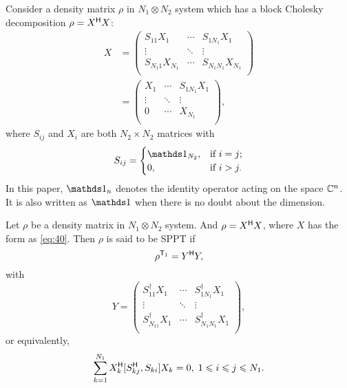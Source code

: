 Consider a density matrix $\rho$ in $N_1\otimes N_2$ system which has a block Cholesky decomposition $\rho = X^{\mathsf{H}} X$:
\begin{equation}
  \label{eq:40}
  \begin{split}
    X&=
    \begin{pmatrix}
      S_{11}X_1 &\cdots&S_{1N_1}X_1\\
      \vdots&\ddots& \vdots\\
      S_{N_1 1}X_{N_1}&\cdots&S_{N_1N_1}X_{N_1}\\
    \end{pmatrix}\\
    & =
    \begin{pmatrix}
      X_1 &\cdots&S_{1N_1}X_1\\
      \vdots&\ddots& \vdots\\
      0&\cdots&X_{N_1}\\
    \end{pmatrix},
  \end{split}
\end{equation}
where $S_{ij}$ and $X_i$ are both $N_2\times N_2$ matrices with
\begin{equation*}
  S_{ij} =
  \begin{cases}
    \I_{N_2}, & \text {if } i=j;\\
    0, & \text{if }i > j.
  \end{cases}
\end{equation*}
In this paper,    $\I_n$ denotes the identity operator acting on the space $\mathbb{C}^n$. It is also written   
as $\I$ when there is no doubt about the dimension.
\begin{defi}
  Let $\rho$ be a density matrix in $N_1\otimes N_2$ system. And $\rho = X^{\mathsf{H}} X$, where $X$ has the form as
  \cref{eq:40}. Then $\rho$ is said to be SPPT if
  \begin{equation}
    \label{eq:41}
    \rho^{\mathsf{T}_1} = Y^{\mathsf{H}} Y,
  \end{equation}
  with
  \begin{equation*}
    Y =
    \begin{pmatrix}
      S^\dagger_{11}X_1&\cdots &S^\dagger_{1N_1}X_1\\
      \vdots&\ddots&\vdots\\
      S^\dagger_{N_11}X_1&\cdots&S^\dagger_{N_1N_1}X_1\\
    \end{pmatrix},
  \end{equation*}
  or equivalently,
  \begin{equation}
    \label{eq:42}
    \sum_{k=1} ^{N_1} X^{\mathsf{H}}_k [S^{\mathsf{H}}_{kj},S_{ki}]X_k = 0,\;1\leqslant i \leqslant j\leqslant N_1.
  \end{equation}
\end{defi}

